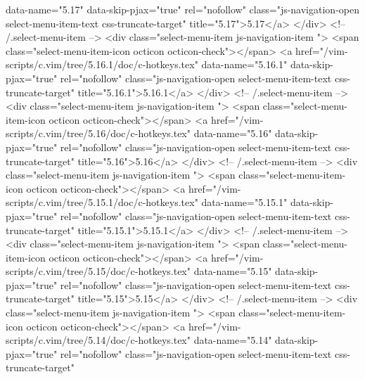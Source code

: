                  data-name="5.17"
                 data-skip-pjax="true"
                 rel="nofollow"
                 class="js-navigation-open select-menu-item-text css-truncate-target"
                 title="5.17">5.17</a>
            </div> <!-- /.select-menu-item -->
            <div class="select-menu-item js-navigation-item ">
              <span class="select-menu-item-icon octicon octicon-check"></span>
              <a href="/vim-scripts/c.vim/tree/5.16.1/doc/c-hotkeys.tex"
                 data-name="5.16.1"
                 data-skip-pjax="true"
                 rel="nofollow"
                 class="js-navigation-open select-menu-item-text css-truncate-target"
                 title="5.16.1">5.16.1</a>
            </div> <!-- /.select-menu-item -->
            <div class="select-menu-item js-navigation-item ">
              <span class="select-menu-item-icon octicon octicon-check"></span>
              <a href="/vim-scripts/c.vim/tree/5.16/doc/c-hotkeys.tex"
                 data-name="5.16"
                 data-skip-pjax="true"
                 rel="nofollow"
                 class="js-navigation-open select-menu-item-text css-truncate-target"
                 title="5.16">5.16</a>
            </div> <!-- /.select-menu-item -->
            <div class="select-menu-item js-navigation-item ">
              <span class="select-menu-item-icon octicon octicon-check"></span>
              <a href="/vim-scripts/c.vim/tree/5.15.1/doc/c-hotkeys.tex"
                 data-name="5.15.1"
                 data-skip-pjax="true"
                 rel="nofollow"
                 class="js-navigation-open select-menu-item-text css-truncate-target"
                 title="5.15.1">5.15.1</a>
            </div> <!-- /.select-menu-item -->
            <div class="select-menu-item js-navigation-item ">
              <span class="select-menu-item-icon octicon octicon-check"></span>
              <a href="/vim-scripts/c.vim/tree/5.15/doc/c-hotkeys.tex"
                 data-name="5.15"
                 data-skip-pjax="true"
                 rel="nofollow"
                 class="js-navigation-open select-menu-item-text css-truncate-target"
                 title="5.15">5.15</a>
            </div> <!-- /.select-menu-item -->
            <div class="select-menu-item js-navigation-item ">
              <span class="select-menu-item-icon octicon octicon-check"></span>
              <a href="/vim-scripts/c.vim/tree/5.14/doc/c-hotkeys.tex"
                 data-name="5.14"
                 data-skip-pjax="true"
                 rel="nofollow"
                 class="js-navigation-open select-menu-item-text css-truncate-target"
